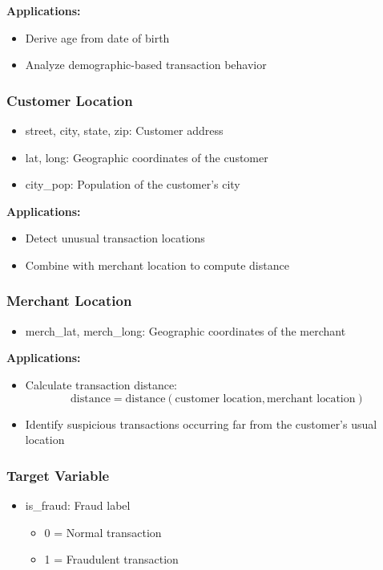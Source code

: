 \textbf{Applications:}
\begin{itemize}
    \item Derive age from date of birth
    \item Analyze demographic-based transaction behavior
\end{itemize}

\subsubsection{Customer Location}
\begin{itemize}
    \item street, city, state, zip: Customer address
    \item lat, long: Geographic coordinates of the customer
    \item city\_pop: Population of the customer's city
\end{itemize}

\textbf{Applications:}
\begin{itemize}
    \item Detect unusual transaction locations
    \item Combine with merchant location to compute distance
\end{itemize}

\subsubsection{Merchant Location}
\begin{itemize}
    \item merch\_lat, merch\_long: Geographic coordinates of the merchant
\end{itemize}

\textbf{Applications:}
\begin{itemize}
    \item Calculate transaction distance:
    \[
    \text{distance} = \text{distance}(\text{customer location}, \text{merchant location})
    \]
    \item Identify suspicious transactions occurring far from the customer's usual location
\end{itemize}

\subsubsection{Target Variable}
\begin{itemize}
    \item is\_fraud: Fraud label
    \begin{itemize}
        \item 0 = Normal transaction
        \item 1 = Fraudulent transaction
    \end{itemize}
\end{itemize}

